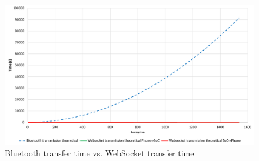 \documentclass[a4paper, 11pt]{report}
\begin{document}
\begin{figure}[ht]
\centering
\includegraphics[scale=0.45]{images/BluetoothVsWebsocket.pdf}
\caption{Bluetooth transfer time vs. WebSocket transfer time}\label{graph:bluetoothVsWebsocket}
\end{figure}
\end{document}
